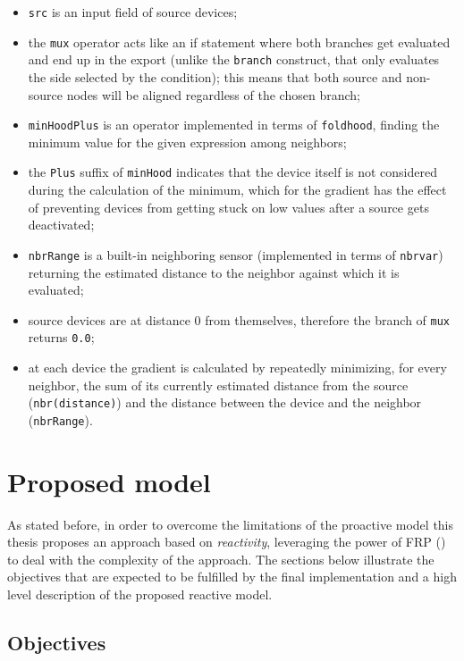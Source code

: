 \begin{itemize}
    \item \texttt{src} is an input field of source devices;
    \item the \texttt{mux} operator acts like an if statement where both branches get evaluated and end up in the export (unlike the \texttt{branch} construct, that only evaluates the side selected by the condition); this means that both source and non-source nodes will be aligned regardless of the chosen branch;
    \item \texttt{minHoodPlus} is an operator implemented in terms of \texttt{foldhood}, finding the minimum value for the given expression among neighbors;
    \item the \texttt{Plus} suffix of \texttt{minHood} indicates that the device itself is not considered during the calculation of the minimum, which for the gradient has the effect of preventing devices from getting stuck on low values after a source gets deactivated;
    \item \texttt{nbrRange} is a built-in neighboring sensor (implemented in terms of \texttt{nbrvar}) returning the estimated distance to the neighbor against which it is evaluated;
    \item source devices are at distance 0 from themselves, therefore the  branch of \texttt{mux} returns \texttt{0.0};
    \item at each device the gradient is calculated by repeatedly minimizing, for every neighbor, the sum of its currently estimated distance from the source (\texttt{nbr(distance)}) and the distance between the device and the neighbor (\texttt{nbrRange}).
\end{itemize}

\section{Proposed model}
\label{sec:proposed-model}

As stated before, in order to overcome the limitations of the proactive model this thesis proposes an approach based on \textit{reactivity}, leveraging the power of FRP () to deal with the complexity of the approach.
%
The sections below illustrate the objectives that are expected to be fulfilled by the final implementation and a high level description of the proposed reactive model.

\subsection{Objectives}
\label{sec:objectives}

